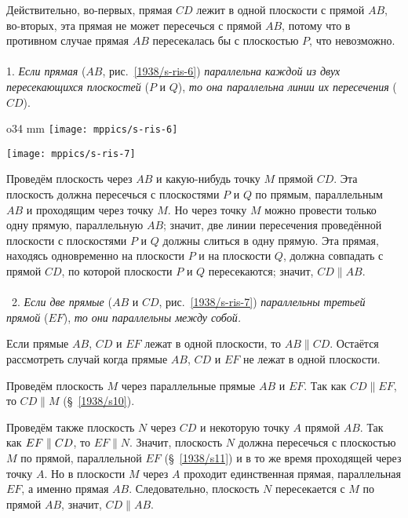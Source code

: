 Действительно, во-первых, прямая $CD$ лежит в одной плоскости с прямой $AB$, во-вторых, эта прямая не может пересечься с прямой $AB$, потому что в противном случае прямая $AB$ пересекалась бы с плоскостью $P$, что невозможно.

\paragraph{}\label{1938/s12}
 1.
\emph{Если прямая} ($AB$, рис.~\ref{1938/s-ris-6}) \emph{параллельна каждой из двух пересекающихся плоскостей} ($P$ и $Q$), \emph{то она параллельна линии их пересечения} ($CD$).

{

\begin{wrapfigure}{o}{34 mm}
\centering
\texttt{[image: mppics/s-ris-6]}
\caption{}\label{1938/s-ris-6}
\bigskip
\texttt{[image: mppics/s-ris-7]}
\caption{}\label{1938/s-ris-7}
\end{wrapfigure}

Проведём плоскость через $AB$ и какую-нибудь точку $M$ прямой $CD$.
Эта плоскость должна пересечься с плоскостями $P$ и $Q$ по прямым, параллельным $AB$ и проходящим через точку $M$.
Но через точку $M$ можно провести только одну прямую, параллельную $AB$;
значит, две линии пересечения проведённой плоскости с плоскостями $P$ и $Q$ должны слиться в одну прямую.
Эта прямая, находясь одновременно на плоскости $P$ и на плоскости $Q$, должна совпадать с прямой $CD$, по которой плоскости $P$ и $Q$ пересекаются;
значит, $CD \parallel AB$.

\paragraph{}\label{1938/s13}
\mbox{ 2.}
\emph{Если две прямые} ($AB$ и $CD$, рис.~\ref{1938/s-ris-7}) \emph{параллельны третьей прямой} ($EF$), \emph{то они параллельны между собой.}

Если прямые $AB$, $CD$ и $EF$ лежат в одной плоскости, то $AB\parallel CD$.
Остаётся рассмотреть случай когда прямые $AB$, $CD$ и $EF$ не лежат в одной плоскости.

Проведём плоскость $M$ через параллельные прямые $AB$ и $EF$.
Так как $CD \parallel EF$, то $CD \parallel M$ (§~\ref{1938/s10}).

}

Проведём также плоскость $N$ через $CD$ и некоторую точку $A$ прямой $AB$.
Так как $EF\z\parallel CD$, то $EF\parallel N$.
Значит, плоскость $N$ должна пересечься с плоскостью $M$ по прямой, параллельной $EF$ (§~\ref{1938/s11}) и в то же время проходящей через точку $A$.
Но в плоскости $M$ через $A$ проходит единственная прямая, параллельная $EF$, а именно прямая $AB$.
Следовательно, плоскость $N$ пересекается с $M$ по прямой $AB$, значит, $CD \parallel AB$.


